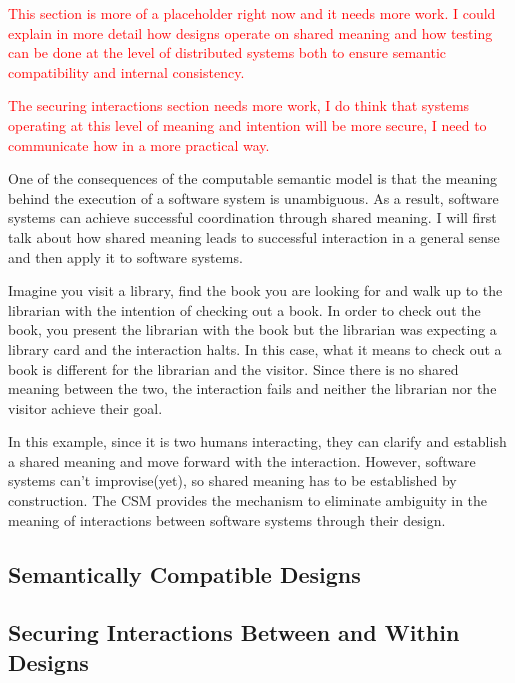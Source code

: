 
\textcolor{red}{This section is more of a placeholder right now and it needs more work. I could explain in more detail how designs operate on shared meaning and how testing can be done at the level of distributed systems both to ensure semantic compatibility and internal consistency.}

\textcolor{red}{The securing interactions section needs more work, I do think that systems operating at this level of meaning and intention will be more secure, I need to communicate how in a more practical way.}

One of the consequences of the computable semantic model is that the meaning behind the execution of a software system is unambiguous. As a result, software systems can achieve successful coordination through shared meaning. I will first talk about how shared meaning leads to successful interaction in a general sense and then apply it to software systems.

Imagine you visit a library, find the book you are looking for and walk up to the librarian with the intention of checking out a book. In order to check out the book, you present the librarian with the book but the librarian was expecting a library card and the interaction halts. In this case, what it means to check out a book is different for the librarian and the visitor. Since there is no shared meaning between the two, the interaction fails and neither the librarian nor the visitor achieve their goal.

In this example, since it is two humans interacting, they can clarify and establish a shared meaning and move forward with the interaction. However, software systems can't improvise(yet), so shared meaning has to be established by construction. The CSM provides the mechanism to eliminate ambiguity in the meaning of interactions between software systems through their design.

\subsection{Semantically Compatible Designs}


\subsection{Securing Interactions Between and Within Designs}
